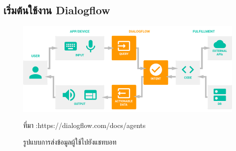  \subsection{เริ่มต้นใช้งาน Dialogflow}
 \begin{figure}[H]
	\centering
	\includegraphics[width=0.7\columnwidth]{Figures/2/chatbot}
	\caption{รูปแบบการส่งข้อมูลผู้ใช้ไปยังแชทบอท}{ที่มา :https://dialogflow.com/docs/agents}
	\label{Fig:dialogflow}
\end{figure}
